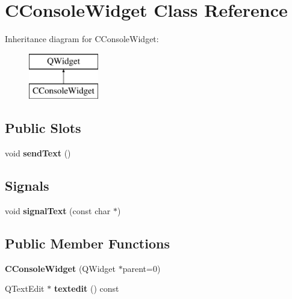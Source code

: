 \hypertarget{class_c_console_widget}{}\section{C\+Console\+Widget Class Reference}
\label{class_c_console_widget}
Inheritance diagram for C\+Console\+Widget\+:\begin{figure}[H]
\begin{center}
\leavevmode
\includegraphics[height=2.000000cm]{class_c_console_widget}
\end{center}
\end{figure}
\subsection*{Public Slots}
\begin{DoxyCompactItemize}
\item 
\mbox{\label{class_c_console_widget_abf5ebfec63aad1a67f3e2aa7edee5d9f}} 
void {\bfseries send\+Text} ()
\end{DoxyCompactItemize}
\subsection*{Signals}
\begin{DoxyCompactItemize}
\item 
\mbox{\label{class_c_console_widget_a04c78d12447e214779ffdf64298608eb}} 
void {\bfseries signal\+Text} (const char $\ast$)
\end{DoxyCompactItemize}
\subsection*{Public Member Functions}
\begin{DoxyCompactItemize}
\item 
\mbox{\label{class_c_console_widget_a3a865ddb0f58502bd5cea5020c0cbf7c}} 
{\bfseries C\+Console\+Widget} (Q\+Widget $\ast$parent=0)
\item 
\mbox{\label{class_c_console_widget_a28b075ed449e4f981dd8a11c4f1965bd}} 
Q\+Text\+Edit $\ast$ {\bfseries textedit} () const
\end{DoxyCompactItemize}
